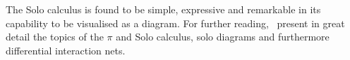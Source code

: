     \begin{remarks}
        The Solo calculus is found to be simple, expressive and remarkable in its capability to be visualised as a diagram.
        For further reading,~\cite{acyclic-solos} present in great detail the topics of the $\pi$ and Solo calculus, solo diagrams and furthermore differential interaction nets.
    \end{remarks}
